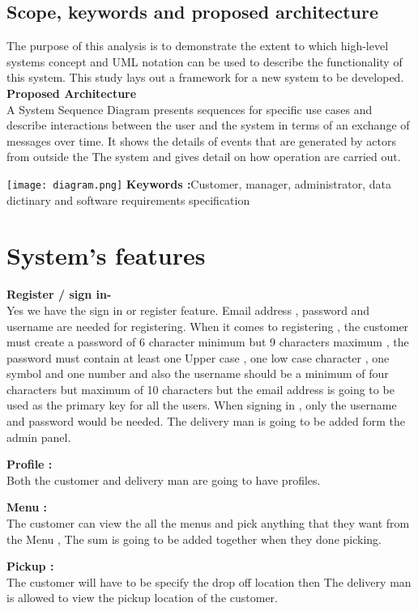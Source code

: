 \documentclass[11pt]{article}
\begin{document}
\subsection{\Large Scope, keywords and proposed architecture}
The purpose of this analysis is to demonstrate the extent to which high-level systems concept and UML notation can be used to describe the functionality of this system. This study lays out a framework for a new system to be developed.\\
\textbf {\Large Proposed Architecture}\\
A System Sequence Diagram presents sequences for specific use cases and describe interactions between the user and the system in terms of an exchange of messages over time. It shows the details of events that are generated by actors from outside the  The system and gives detail on how operation are carried out. 

\texttt{[image: diagram.png]}
\textbf {Keywords :}Customer, manager, administrator, data dictinary and software requirements specification\\

\section {\Large System's features}
\textbf {Register / sign in-}\\
Yes  we have the sign in or register feature. Email address , password and username are needed for registering. When it comes to registering , the customer must create a password of  6 character minimum but 9 characters maximum , the password must contain  at least one Upper case , one low case character , one symbol and one number and also the username should be a minimum of four characters but maximum of 10 characters   but the email address is going to be used as the primary key for all the users. When signing in , only the username and password would be needed. The delivery man is going to be added form the admin panel.

\textbf {Profile :}\\
Both the customer and delivery man are going to have profiles.

\textbf {Menu :}\\
The customer can view the all the menus and pick anything that they want from the Menu , The sum is going to be added together  when they  done picking.

\textbf {Pickup :} \\ 
The customer will have to be specify the drop off location then The delivery man is allowed to view the pickup location of the customer.
\end{document}
